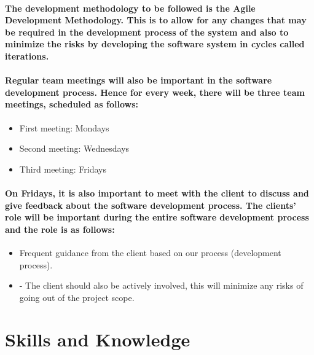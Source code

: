 \documentclass{article}
\begin{document}
\paragraph{The development methodology to be followed is the Agile Development Methodology. This is to allow for any changes that may be required in the development process of the system and also to minimize the risks by developing the software system in cycles called iterations.}

\paragraph{Regular team meetings will also be important in the software development process. Hence for every week, there will be three team meetings, scheduled as follows:}

\begin{itemize}
\item First meeting: Mondays
\item Second meeting: Wednesdays
\item Third meeting: Fridays
\end{itemize}

\paragraph{On Fridays, it is also important to meet with the client to discuss and give feedback about the software development process. The clients’ role will be important during the entire software development process and the role is as follows:}

\begin{itemize}
\item Frequent guidance from the client based on our process (development process).
\item -	The client should also be actively involved, this will minimize any risks of going out of the project scope.
\end{itemize}

\section{Skills and Knowledge}
\end{document}
